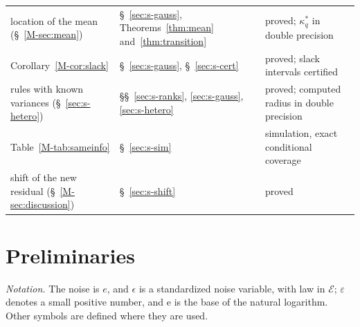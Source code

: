 \documentclass[11pt]{article}
\renewcommand{\_}{\usc\allowbreak}
\begin{document}
\begin{table}[h]
\begin{tabular}{>{\raggedright\arraybackslash}p{}>{\raggedright\arraybackslash}p{}>{\raggedright\arraybackslash}p{}}
location of the mean (\S~\ref{M-sec:mean}) & \S~\ref{sec:s-gauss}, Theorems~\ref{thm:mean} and~\ref{thm:transition} & proved; $\kappa^*_q$ in double precision \\
Corollary~\ref{M-cor:slack} & \S~\ref{sec:s-gauss}, \S~\ref{sec:s-cert} & proved; slack intervals certified \\
rules with known variances (\S~\ref{sec:s-hetero}) & \S\S~\ref{sec:s-ranks}, \ref{sec:s-gauss}, \ref{sec:s-hetero} & proved; computed radius in double precision \\
Table~\ref{M-tab:sameinfo} & \S~\ref{sec:s-sim} & simulation, exact conditional coverage \\
shift of the new residual (\S~\ref{M-sec:discussion}) & \S~\ref{sec:s-shift} & proved \\
\bottomrule
\end{tabular}
\end{table}

\section{Preliminaries}\label{sec:s-prelim}

\emph{Notation.} The noise is $e$, and $\epsilon$ is a standardized noise variable, with law in $\mathcal E$; $\varepsilon$ denotes a small positive number, and $\mathrm{e}$ is the base of the natural logarithm. Other symbols are defined where they are used.
\end{document}
